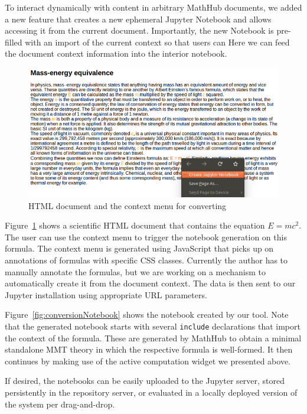 To interact dynamically with content in arbitrary MathHub documents, we added a new feature that creates a new ephemeral Jupyter Notebook and allows accessing it from the current document.
Importantly, the new Notebook is pre-filled with an import of the current context so that users can Here we can feed the document context information into the interior notebook.

\begin{figure}[ht]\centering
  \includegraphics[width=15cm]{../D4.11/conversionHTML}
  \caption{HTML document and the context menu for converting}\label{fig:conversionHTML}
\end{figure}

Figure~\ref{fig:conversionHTML} shows a scientific HTML document that contains the equation $E=mc^2$.
The user can use the context menu to trigger the notebook generation on this formula.
The context menu is generated using JavaScript that picks up on annotations of formulas with specific CSS classes.
Currently the author has to manually annotate the formulas, but we are working on a mechanism to automatically create it from the document context.
The data is then sent to our Jupyter installation using appropriate URL parameters. 

Figure~\ref{fig:conversionNotebook} shows the notebook created by our tool.
Note that the generated notebook starts with several \texttt{include} declarations that import the context of the formula.
These are generated by MathHub to obtain a minimal standalone MMT theory in which the respective formula is well-formed. 
It then continues by making use of the active computation widget we presented above. 

If desired, the notebooks can be easily uploaded to the Jupyter server, stored persistently in the repository server, or evaluated in a locally deployed version of the system per drag-and-drop.

